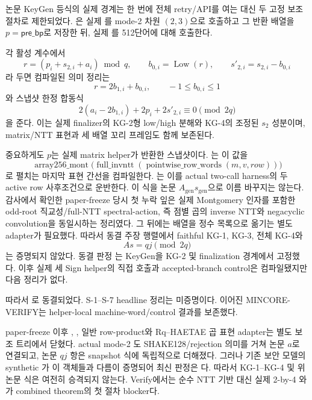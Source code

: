 논문 KeyGen 등식의 실제 경계는 한 번에 전체 retry/API를 여는 대신 두 고정
보조절차로 제한되었다.
은 실제
를 mode-2 차원 \((2,3)\)으로 호출하고 그 반환
배열을 \(p=\mathsf{pre\_bp}\)로 저장한 뒤, 실제
를 512단어에 대해 호출한다.

각 활성 계수에서
\[
  r=(p_i+s_{2,i}+a_i)\bmod q,\qquad
  b_{0,i}=\operatorname{Low}(r),\qquad
  s'_{2,i}=s_{2,i}-b_{0,i}
\]
라 두면 컴파일된 의미 정리는
\[
  r=2b_{1,i}+b_{0,i},\qquad -1\le b_{0,i}\le1
\]
와 스냅샷 한정 합동식
\[
  2(a_i-2b_{1,i})+2p_i+2s'_{2,i}\equiv0\pmod{2q}
\]
을 준다. 이는 실제 finalizer의 KG-2형 low/high 분해와 KG-4의 조정된
\(s_2\) 성분이며, matrix/NTT 표현과 세 배열 꼬리 프레임도 함께 보존된다.

중요하게도 \(p\)는 실제 matrix helper가 반환한
 스냅샷이다.
는 이 값을
\[
 \operatorname{array256\_mont}
 \bigl(\operatorname{full\_invntt}
   (\operatorname{pointwise\_row\_words}(m,v,row))\bigr)
\]
로 펼치는 마지막 표현 간선을 컴파일한다.
는 이를 actual two-call
harness의 두 active row 사후조건으로 운반한다. 이 식을 논문
\(A_{\mathrm{gen}}s_{\mathrm{gen}}\)으로 이름 바꾸지는 않는다. 감사에서 확인한
paper-freeze 당시 첫 누락 잎은 실제 Montgomery 인자를 포함한 odd-root 직교성/full-NTT
spectral-action, 즉 점별 곱의 inverse NTT와  negacyclic
convolution을 동일시하는 정리였다. 그 뒤에는  배열을
 정수 목록으로 옮기는 별도 adapter가
필요했다. 따라서 동결 주장 행렬에서 faithful KG-1, KG-3, 전체 KG-4와
\[
  A s=qj\pmod{2q}
\]
는 증명되지 않았다. 동결 판정 는 KeyGen을 KG-2 및
finalization 경계에서 고정했다. 이후 실제 세 Sign helper의 직접 호출과
accepted-branch control은 컴파일됐지만 다음 정리가 없다.
\begin{center}
  \small{}
\end{center}
따라서 로 동결되었다. S-1--S-7 headline 정리는
미증명이다. 이어진 MINCORE-VERIFY는 helper-local machine-word/control 결과를
보존했다.

paper-freeze 이후 ,
\allowbreak{},
일반 row-product와
Rq--HAETAE 곱 표현 adapter는 별도 보조 트리에서 닫혔다. actual mode-2
도 SHAKE128/rejection 의미를 거쳐 논문 \(a\)로 연결되고,
논문 \(qj\) 항은 snapshot 식에 독립적으로 더해졌다. 그러나 기존 보안 모델의
synthetic 가 이 객체들과 다름이 증명되어
최신 판정은 다. 따라서 KG-1--KG-4 및 위 논문 식은
여전히 승격되지 않는다. Verify에서는 순수 NTT 기반 대신 실제 2-by-4
와
가 combined theorem의 첫 절차
blocker다.

